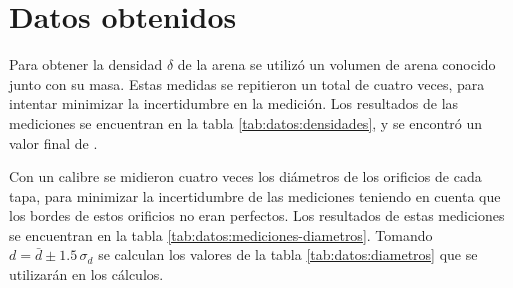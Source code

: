 \section{Datos obtenidos}

Para obtener la densidad $\delta$ de la arena se utilizó un volumen de arena
conocido junto con su masa. Estas medidas se repitieron un total de cuatro 
veces, para intentar minimizar la incertidumbre en la medición. Los resultados
de las mediciones se encuentran en la tabla \ref{tab:datos:densidades}, y
se encontró un valor final de
.

\begin{table}[H]
    \centering
    \caption{Datos obtenidos para la densidad}
    \label{tab:datos:densidades}
\end{table}

Con un calibre se midieron cuatro veces los diámetros de los orificios de cada 
tapa, para minimizar la incertidumbre de las mediciones teniendo en cuenta
que los bordes de estos orificios no eran perfectos. Los resultados de estas 
mediciones se encuentran en la tabla \ref{tab:datos:mediciones-diametros}.
Tomando $d = \bar{d} \pm 1.5\, \sigma_d$ se calculan los valores de la tabla
\ref{tab:datos:diametros} que se utilizarán en los cálculos.

\begin{table}[H]
    \centering
    \caption{Diámetros medidos de cada tapa. Valores expresados en \si{\mm}
    ($\pm\, 0.02$).}
    \label{tab:datos:mediciones-diametros}
\end{table}

\begin{table}[H]
    \centering
    \caption{Diámetros calculados para cada tapa.}
    \label{tab:datos:diametros}
\end{table}

